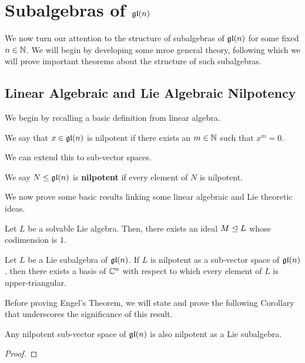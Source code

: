 \section{Subalgebras of $\mathfrak{gl}\!\left( n \right)$}

We now turn our attention to the structure of subalgebras of $\mathfrak{gl}\!\left( n \right)$ for some fixed $n \in \mathbb{N}$. We will begin by developing some mroe general theory, following which we will prove important theorems about the structure of such subalgebras.

\subsection{Linear Algebraic and Lie Algebraic Nilpotency}

We begin by recalling a basic definition from linear algebra.

\begin{boxdefinition}
    We say that $x \in \mathfrak{gl}\!\left( n \right)$ is nilpotent if there exists an $m \in \mathbb{N}$ such that $x^m = 0$. 
\end{boxdefinition}

We can extend this to sub-vector spaces.

\begin{boxdefinition}
    We say $N \leq \mathfrak{gl}\!\left( n \right)$ is \textbf{nilpotent} if every element of $N$ is nilpotent.
\end{boxdefinition}

We now prove some basic results linking some linear algebraic and Lie theoretic ideas.

\begin{lemma}  %
    Let $L$ be a solvable Lie algebra. Then, there exists an ideal $M \trianglelefteq L$ whose codimension is $1$.
\end{lemma}

\begin{boxtheorem}
    Let $L$ be a Lie subalgebra of $\mathfrak{gl}\!\left( n \right)$. If $L$ is nilpotent as a sub-vector space of $\mathfrak{gl}\!\left( n \right)$, then there exists a basis of $\mathbb{C}^n$ with respect to which every element of $L$ is upper-triangular.
\end{boxtheorem}

Before proving Engel's Theorem, we will state and prove the following Corollary that underscores the significance of this result.

\begin{boxcorollary}
    Any nilpotent sub-vector space of $\mathfrak{gl}\!\left( n \right)$ is also nilpotent as a Lie subalgebra.
\end{boxcorollary}
\begin{proof}
    \sorry
\end{proof}

